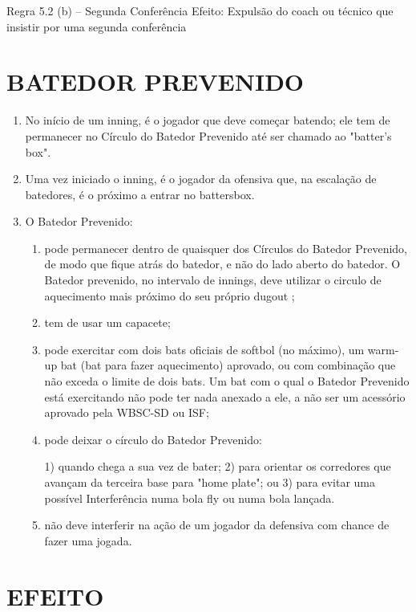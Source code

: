 Regra 5.2 (b) -- Segunda Conferência
 Efeito: Expulsão do \gls{coach} ou técnico que insistir por uma segunda
 conferência

\section{BATEDOR PREVENIDO}

\begin{enumerate}[label=(\alph*)]
	\item  No início de um \gls{inning}, é o jogador que deve começar batendo; ele tem de permanecer no Círculo do Batedor Prevenido até ser chamado ao "batter's box".
	\item  Uma vez iniciado o \gls{inning}, é o jogador da ofensiva que, na escalação de batedores, é o próximo a entrar no \gls{battersbox}.
	\item  O Batedor Prevenido:
	\begin{enumerate}[label=\roman*.]
		\item pode permanecer dentro de quaisquer dos Círculos do Batedor Prevenido, de modo que fique atrás do batedor, e não do lado aberto do batedor. O Batedor prevenido, no intervalo de innings, deve utilizar o circulo de aquecimento mais próximo do seu próprio dugout ;
		\item tem de usar um capacete;
		\item  pode exercitar com dois \glspl{bat} oficiais de softbol (no máximo), um \gls{warm-up bat} (\gls{bat} para fazer aquecimento) aprovado, ou com combinação que não exceda o limite de dois \glspl{bat}. Um \gls{bat} com o qual o Batedor Prevenido está  exercitando não pode ter nada anexado a ele, a não ser um acessório aprovado pela WBSC-SD ou ISF;
		\item  pode deixar o círculo do Batedor Prevenido:

			 1) quando chega a sua vez de bater;
			 2) para orientar os corredores que avançam da terceira base para "home plate"; ou
			 3) para evitar uma possível Interferência numa bola \gls{fly} ou numa bola lançada.

		\item  não deve interferir na ação de um jogador da defensiva com chance de fazer uma jogada.
	\end{enumerate}
\end{enumerate}

\section*{EFEITO}

